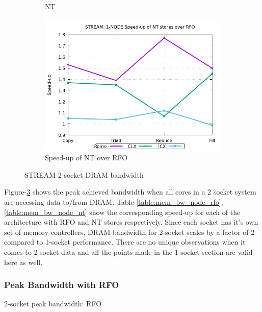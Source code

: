 \documentclass{article}
\begin{document}
\begin{figure}[!ht]
\begin{subfigure}[!ht]{0.3\textwidth}
         \caption{NT}
         \label{figure:mem_bw_node_nt}
    \end{subfigure}
    \begin{subfigure}[!ht]{0.3\textwidth}
         \centering
         \includegraphics[width=\textwidth]{../mem_bw_node/mb_node_nt_rfo}
         \caption{Speed-up of NT over RFO}
         \label{figure:mem_bw_node_nt_rfo}
    \end{subfigure}

    \caption{STREAM 2-socket DRAM bandwidth}
    \label{figure:mem_bw_node}
\end{figure}

Figure-\ref{figure:mem_bw_node} shows the peak achieved bandwidth when all cores in a 2 socket system are accessing data to/from DRAM. Table-\ref{table:mem_bw_node_rfo}, \ref{table:mem_bw_node_nt} show the corresponding speed-up for each of the architecture with RFO and NT stores respectively. Since each socket has it's own set of memory controllers, DRAM bandwidth for 2-socket scales by a factor of 2 compared to 1-socket performance. There are no unique observations when it comes to 2-socket data and all the points made in the 1-socket section are valid here as well.

\subsubsection{Peak Bandwidth with RFO}
\begin{table}[h!]
\centering

\caption{2-socket peak bandwidth: RFO}
\label{table:mem_bw_node_rfo}
\end{table}
\end{document}
